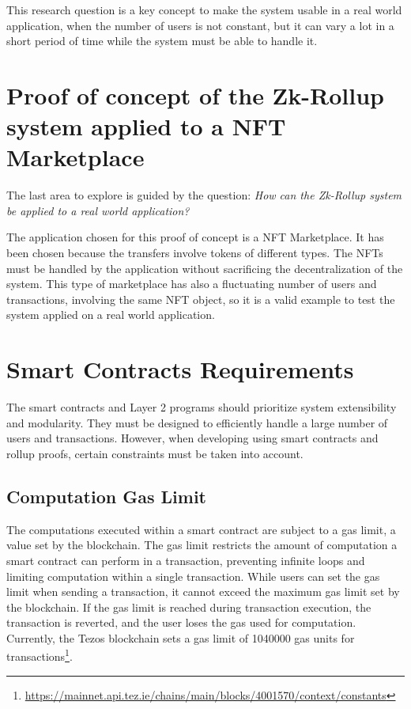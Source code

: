 This research question is a key concept to make the system usable in a real world application, when the number of users is not constant, but it can vary a lot in a short period of time while the system must be able to handle it.

\section{Proof of concept of the Zk-Rollup system applied to a NFT Marketplace}
The last area to explore is guided by the question: \textit{How can the Zk-Rollup system be applied to a real world application?}

The application chosen for this proof of concept is a NFT Marketplace. It has been chosen because the transfers involve tokens of different types. The NFTs must be handled by the application without sacrificing the decentralization of the system. This type of marketplace has also a fluctuating number of users and transactions, involving the same NFT object, so it is a valid example to test the system applied on a real world application.

\section{Smart Contracts Requirements \label{sec:3_smartContractsRequirements}}

The smart contracts and Layer 2 programs should prioritize system extensibility and modularity. They must be designed to efficiently handle a large number of users and transactions. However, when developing using smart contracts and rollup proofs, certain constraints must be taken into account.

\subsection{Computation Gas Limit \label{subsec:gasLimit}}

The computations executed within a smart contract are subject to a gas limit, a value set by the blockchain. The gas limit restricts the amount of computation a smart contract can perform in a transaction, preventing infinite loops and limiting computation within a single transaction. While users can set the gas limit when sending a transaction, it cannot exceed the maximum gas limit set by the blockchain. If the gas limit is reached during transaction execution, the transaction is reverted, and the user loses the gas used for computation. Currently, the Tezos blockchain sets a gas limit of 1040000 gas units for transactions\footnote{\url{https://mainnet.api.tez.ie/chains/main/blocks/4001570/context/constants}}.

